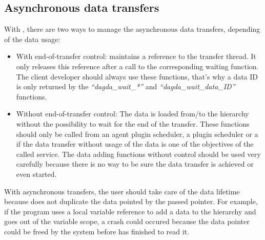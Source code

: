 \subsection{Asynchronous data transfers}
With \dagda, there are two ways to manage the asynchronous data
transfers, depending of the data usage:
\begin{itemize}
  \item With end-of-transfer control: \dagda maintains a reference to
    the transfer thread. It only releases this reference after a call
    to the corresponding waiting function. The client developer should
    always use these functions, that's why a data ID is only returned
    by the \textit{``dagda\_wait\_*''} and
    \textit{``dagda\_wait\_data\_ID''} functions.
  \item Without end-of-transfer control: The data is loaded from/to
    the \dagda hierarchy without the possibility to wait for the end
    of the transfer.  These functions should only be called from an
    agent plugin scheduler, a \sed plugin scheduler or a \sed if the
    data transfer without usage of the data is one of the objectives
    of the called service. The data adding functions without control
    should be used very carefully because there is no way to be sure
    the data transfer is achieved or even started.    
\end{itemize}
With asynchronous transfers, the user should take care of the data
lifetime because \dagda does not duplicate the data pointed by the
passed pointer.  For example, if the program uses a local variable
reference to add a data to the \dagda hierarchy and goes out of the
variable scope, a crash could occured because the data pointer could
be freed by the system before \dagda has finished to read it.
